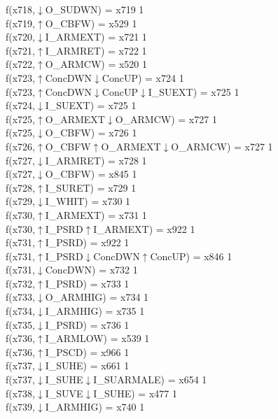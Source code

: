 f(x718,$\downarrow$O\_SUDWN) = x719 {1} \\
f(x719,$\uparrow$O\_CBFW) = x529 {1} \\
f(x720,$\downarrow$I\_ARMEXT) = x721 {1} \\
f(x721,$\uparrow$I\_ARMRET) = x722 {1} \\
f(x722,$\uparrow$O\_ARMCW) = x520 {1} \\
f(x723,$\uparrow$ConcDWN$\downarrow$ConcUP) = x724 {1} \\
f(x723,$\uparrow$ConcDWN$\downarrow$ConcUP$\downarrow$I\_SUEXT) = x725 {1} \\
f(x724,$\downarrow$I\_SUEXT) = x725 {1} \\
f(x725,$\uparrow$O\_ARMEXT$\downarrow$O\_ARMCW) = x727 {1} \\
f(x725,$\downarrow$O\_CBFW) = x726 {1} \\
f(x726,$\uparrow$O\_CBFW$\uparrow$O\_ARMEXT$\downarrow$O\_ARMCW) = x727 {1} \\
f(x727,$\downarrow$I\_ARMRET) = x728 {1} \\
f(x727,$\downarrow$O\_CBFW) = x845 {1} \\
f(x728,$\uparrow$I\_SURET) = x729 {1} \\
f(x729,$\downarrow$I\_WHIT) = x730 {1} \\
f(x730,$\uparrow$I\_ARMEXT) = x731 {1} \\
f(x730,$\uparrow$I\_PSRD$\uparrow$I\_ARMEXT) = x922 {1} \\
f(x731,$\uparrow$I\_PSRD) = x922 {1} \\
f(x731,$\uparrow$I\_PSRD$\downarrow$ConcDWN$\uparrow$ConcUP) = x846 {1} \\
f(x731,$\downarrow$ConcDWN) = x732 {1} \\
f(x732,$\uparrow$I\_PSRD) = x733 {1} \\
f(x733,$\downarrow$O\_ARMHIG) = x734 {1} \\
f(x734,$\downarrow$I\_ARMHIG) = x735 {1} \\
f(x735,$\downarrow$I\_PSRD) = x736 {1} \\
f(x736,$\uparrow$I\_ARMLOW) = x539 {1} \\
f(x736,$\uparrow$I\_PSCD) = x966 {1} \\
f(x737,$\downarrow$I\_SUHE) = x661 {1} \\
f(x737,$\downarrow$I\_SUHE$\downarrow$I\_SUARMALE) = x654 {1} \\
f(x738,$\downarrow$I\_SUVE$\downarrow$I\_SUHE) = x477 {1} \\
f(x739,$\downarrow$I\_ARMHIG) = x740 {1} \\
